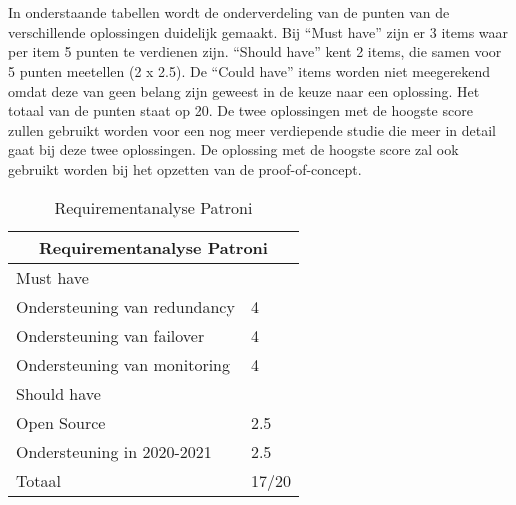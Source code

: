\section{}
\label{sec:Resultatenanalyse}


\subsection{}
\label{subsec:Resultaten requirements}

In onderstaande tabellen wordt de onderverdeling van de punten van de verschillende oplossingen duidelijk gemaakt. Bij “Must have” zijn er 3 items waar per item 5 punten te verdienen zijn. “Should have” kent 2 items, die samen voor 5 punten meetellen (2 x 2.5). De “Could have” items worden niet meegerekend omdat deze van geen belang zijn geweest in de keuze naar een oplossing. Het totaal van de punten staat op 20. De twee oplossingen met de hoogste score zullen gebruikt worden voor een nog meer verdiepende studie die meer in detail gaat bij deze twee oplossingen. De oplossing met de hoogste score zal ook gebruikt worden bij het opzetten van de proof-of-concept.

\begin{table}
\begin{tabular}{ |p{6cm}||p{6cm}|  }
    \hline
    \multicolumn{2}{|c|}{Requirementanalyse Patroni} \\
    \hline
    Must have & \\
    \hline
    Ondersteuning van redundancy  & 4 \\
    Ondersteuning van failover &  4 \\
    Ondersteuning van monitoring & 4 \\
    \hline
    Should have & \\
    \hline
   Open Source &  2.5 \\
   Ondersteuning in 2020-2021 & 2.5 \\
    \hline
    \hline
    Totaal & 17/20 \\
    \hline
\end{tabular}
\caption{Requirementanalyse Patroni}
\label{table:Requirementanalyse Patroni}
\end{table}


